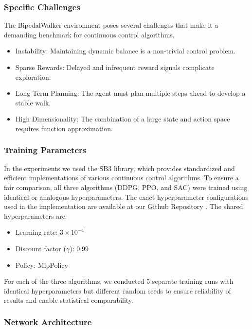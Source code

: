 \subsubsection{Specific Challenges}
The BipedalWalker environment poses several challenges that make it a demanding benchmark for continuous control algorithms.

\begin{itemize}
    \item Instability: Maintaining dynamic balance is a non-trivial control problem.
    \item Sparse Rewards: Delayed and infrequent reward signals complicate exploration.
    \item Long-Term Planning: The agent must plan multiple steps ahead to develop a stable walk.
    \item High Dimensionality: The combination of a large state and action space requires function approximation.
\end{itemize}

\subsubsection{Training Parameters}


In the experiments we used the \gls{SB3} \cite{stablebaselines3docs2023} library, which provides standardized and efficient implementations of various continuous control algorithms. To ensure a fair comparison, all three algorithms (\gls{DDPG}, \gls{PPO}, and \gls{SAC}) were trained using identical or analogous hyperparameters. The exact hyperparameter configurations used in the implementation are available at our Github Repository \cite{kreil2025github}. The shared hyperparameters are:
\begin{itemize}
    \item Learning rate: $3 \times 10^{-4}$
    \item Discount factor ($\gamma$): $0.99$
    \item Policy: MlpPolicy
\end{itemize}

\noindent For each of the three algorithms, we conducted 5 separate training runs with identical hyperparameters but different random seeds to ensure reliability of results and enable statistical comparability.

\subsubsection{Network Architecture}

